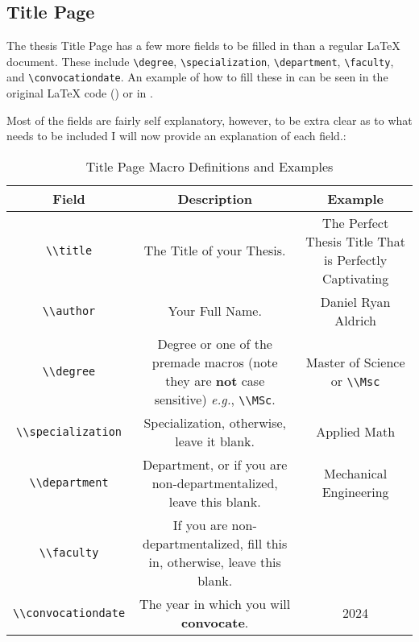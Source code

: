 \subsection{Title Page}
The thesis Title Page has a few more fields to be filled in than a regular \LaTeX{} document.
These include \lstinline|\degree|, \lstinline|\specialization|, \lstinline|\department|, \lstinline|\faculty|, and \lstinline|\convocationdate|.
An example of how to fill these in can be seen in the original \LaTeX{} code () or in .

Most of the fields are fairly self explanatory, however, to be extra clear as to what needs to be included I will now provide an explanation of each field.:

\begin{table}[H]
\caption{Title Page Macro Definitions and Examples}
\label{tab:titlePage}
\begin{tabularx}{0.9\textwidth}{cCC}
	\toprule
		\textbf{Field} & \textbf{Description} & \textbf{Example}\\
	\midrule
		\lstinline|\\title|  & The Title of your Thesis. & The Perfect Thesis Title That is Perfectly Captivating\\
		\lstinline|\\author| & Your Full Name. & Daniel Ryan Aldrich\\
		\lstinline|\\degree| & Degree or one of the premade macros (note they are \textbf{not} case sensitive) \textit{e.g.}, \lstinline|\\MSc|. & Master of Science or \lstinline|\\Msc|\\
		\lstinline|\\specialization| & Specialization, otherwise, leave it blank. & Applied Math\\
		\lstinline|\\department| & Department, or if you are non-departmentalized, leave this blank. & Mechanical Engineering\\
		\lstinline|\\faculty| & If you are non-departmentalized, fill this in, otherwise, leave this blank. & \\
		\lstinline|\\convocationdate| & The year in which you will \textbf{convocate}. & 2024\\
	\bottomrule
\end{tabularx}
\end{table}

